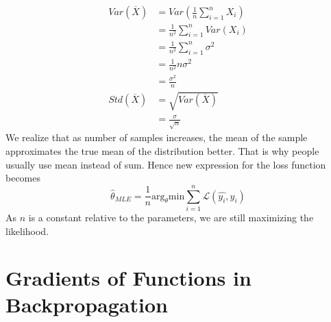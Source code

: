 \documentclass{article}
\numberwithin{equation}{subsection}
\begin{document}
\begin{align}
    Var(\overline{X}) &= Var(\frac{1}{n}\sum_{i=1}^{n} X_i)\\
    &= \frac{1}{n^2} \sum_{i=1}^{n} Var(X_i)\\
    &= \frac{1}{n^2} \sum_{i=1}^{n} \sigma^2\\
    &= \frac{1}{n^2} n \sigma^2\\
    &= \frac{\sigma^2}{n}\\
    Std(\overline{X}) &= \sqrt{Var(\overline{X})}\\
    &= \frac{\sigma}{\sqrt{n}}
\end{align}
We realize that as number of samples increases, the mean of the sample approximates the true mean of the distribution better. That is why people usually use mean instead of sum. Hence new expression for the loss function becomes 
\begin{equation}
    \hat{\theta}_{MLE} = \frac{1}{n}\text{arg}_\theta \text{min} \sum_{i=1}^n \mathcal{L}(\hat{y_i},y_i)
\end{equation}
As $n$ is a constant relative to the parameters, we are still maximizing the likelihood.
\section{Gradients of Functions in Backpropagation}
\end{document}
